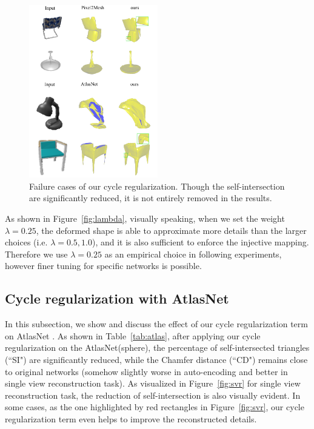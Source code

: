 \begin{figure}
	\begin{center}
		\includegraphics[width=0.5\textwidth]{img/limit/limit}
	\end{center}
	\caption{Failure cases of our cycle regularization. Though the self-intersection are significantly reduced, it is not entirely removed in the results.}
	\label{fig:limit}
\end{figure}

As shown in Figure~\ref{fig:lambda}, visually speaking, when we set the weight $\lambda=0.25$, the deformed shape is able to approximate more details than the larger choices (i.e. $\lambda=0.5,1.0$), and it is also sufficient to enforce the injective mapping.  Therefore we use $\lambda=0.25$ as an empirical choice in following experiments, however finer tuning for specific networks is possible. 

\subsection{Cycle regularization with AtlasNet}
In this subsection, we show and discuss the effect of our cycle regularization term on AtlasNet \cite{atlasnet}. As shown in Table~\ref{tab:atlas}, after applying our cycle regularization on the AtlasNet(sphere), the percentage of self-intersected triangles (``SI") are significantly reduced, while the Chamfer distance (``CD") remains close to original networks (somehow slightly worse in auto-encoding and better in single view reconstruction task). As visualized in Figure~\ref{fig:svr} for single view reconstruction task, the reduction of self-intersection is also visually evident. In some cases, as the one highlighted by red rectangles in Figure~\ref{fig:svr}, our cycle regularization term even helps to improve the reconstructed details.

